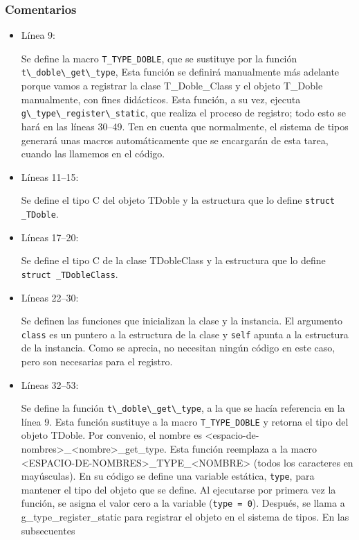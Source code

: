 \subsubsection{Comentarios}
\begin{itemize}
\item Línea 9:\par
  Se define la macro \texttt{T\_TYPE\_DOBLE}, que se sustituye por la función
  \passthrough{\lstinline!t\_doble\_get\_type!}, Esta función se definirá manualmente más adelante porque
  vamos a registrar la clase \textsf{T\_Doble\_Class} y  el objeto \textsf{T\_Doble} manualmente, con fines didácticos.
  Esta función, a su vez, ejecuta \passthrough{\lstinline!g\_type\_register\_static!}, que realiza
  el proceso de registro; todo esto se hará en las líneas 30--49.
  Ten en cuenta que normalmente, el sistema de tipos generará unas macros automáticamente que se encargarán
  de esta tarea, cuando las llamemos en el código.
\item Líneas 11--15:\par
  Se define el tipo C del objeto \textsf{TDoble} y la estructura que lo define \texttt{struct \_TDoble}.
\item Líneas 17--20:\par
  Se define el tipo C de la clase \textsf{TDobleClass} y la estructura que lo define \texttt{struct \_TDobleClass}.
\item Líneas 22--30:\par
  Se definen las funciones que inicializan la clase y la instancia. El argumento \texttt{class} es un puntero a la
  estructura de la clase y \texttt{self} apunta a la estructura de la instancia. Como se aprecia, no
  necesitan ningún código en este caso, pero son necesarias para el registro.
\item Líneas 32--53:\par
  Se define la función \passthrough{\lstinline!t\_doble\_get\_type!}, a la que se hacía referencia en la línea 9.
  Esta función sustituye a la macro \texttt{T\_TYPE\_DOBLE} y retorna el tipo del objeto \textsf{TDoble}.
  Por convenio, el nombre es \textsf{<espacio-de-nombres>\_<nombre>\_get\_type}. Esta función reemplaza
  a la macro \textsf{<ESPACIO-DE-NOMBRES>\_TYPE\_<NOMBRE>} (todos los caracteres en mayúsculas).
  En su código se define una variable estática, \texttt{type}, para mantener el tipo del objeto que se define.
  Al ejecutarse por primera vez la función, se asigna el valor cero a la variable (\texttt{type = 0}).
  Después, se llama a g\_type\_register\_static para registrar el objeto en el sistema de tipos. En las subsecuentes

\end{itemize}
